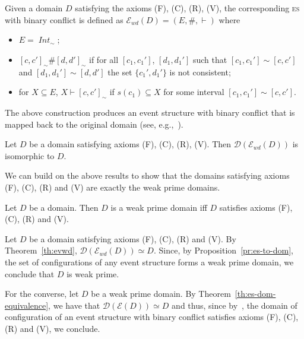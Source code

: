 \documentclass[conference]{IEEEtran}
\renewenvironment{proof}{\begin{IEEEproof}}{\end{IEEEproof}}
\newcommand{\esabbr}{\textsc{es}}
\newcommand{\quotient}[2]{\ensuremath{{#1}_{\scriptscriptstyle {#2}}}}
\newcommand{\zev}[0]{\ensuremath{\mathcal{E}}}
\newcommand{\ev}[1]{\ensuremath{\zev({#1})}}
\newcommand{\zevwd}[0]{\ensuremath{\mathcal{E}_{wd}}}
\newcommand{\evwd}[1]{\ensuremath{\zevwd({#1})}}
\newcommand{\zdom}[0]{\ensuremath{\mathcal{D}}}
\newcommand{\dom}[1]{\ensuremath{\zdom({#1})}}
\newcommand{\dint}[2]{\ensuremath{[{#1},{#2}]}}
\newcommand{\IntSet}[1]{\ensuremath{\mathop{\mathit{Int}({#1})}}}
\begin{document}
\begin{definition}
  \label{de:evwd}
  Given a domain $D$ satisfying the axioms (F), (C), (R), (V), the
  corresponding {\esabbr} with binary conflict is defined as
  $\evwd{D} = (E, \#, \vdash)$ where
  \begin{itemize}
    
  \item
    $E = \quotient{\IntSet{D}}{\sim}$;
  \item $\dint{c}{c'}_\sim \# \dint{d}{d'}_\sim$ if for all
    $\dint{c_1}{c_1'}$, $\dint{d_1}{d_1'}$ such that
    $\dint{c_1}{c_1'} \sim \dint{c}{c'}$ and
    $\dint{d_1}{d_1'} \sim \dint{d}{d'}$ the set $\{c_1',d_1'\}$ is
    not consistent;
    
  \item 
    for $X \subseteq E$, $X \vdash \dint{c}{c'}_\sim$ if
    $s(c_1) \subseteq X$ for some interval
    $\dint{c_1}{c_1'} \sim \dint{c}{c'}$.
  \end{itemize}
\end{definition}

The above construction produces an event structure with binary conflict that is mapped back to the original domain (see, e.g.,~\cite[Corollary 2.10]{Dro:ESD}).

\begin{theorem}
  \label{th:evwd}
  Let $D$ be a domain satisfying axioms (F), (C), (R), (V). Then
  $\dom{\evwd{D}}$ is isomorphic to $D$.
\end{theorem}



We can build on the above results to show that the domains satisfying
axioms (F), (C), (R) and (V) are exactly the weak prime domains.

\begin{proposition}
  Let $D$ be a domain. Then $D$ is a weak prime domain iff $D$
  satisfies axioms (F), (C), (R) and (V).
\end{proposition}

\begin{proof}
  Let $D$ be a domain satisfying axioms (F), (C), (R) and (V).  By
  Theorem~\ref{th:evwd}, $\dom{\evwd{D}} \simeq D$. Since, by
  Proposition~\ref{pr:es-to-dom}, the set of configurations of any
  event structure forms a weak prime domain, we conclude that $D$ is
  weak prime.

  For the converse, let $D$ be a weak prime domain. By
  Theorem~\ref{th:es-dom-equivalence}, we have that
  $\dom{\ev{D}} \simeq D$ and thus, since by~\cite{Winskel:phd,Dro:ESD},
  the domain of configuration of an event structure with binary
  conflict satisfies axioms (F), (C), (R) and (V), we conclude.
\end{proof}
\end{document}
